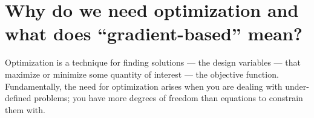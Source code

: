 \documentclass[conf]{new-aiaa}
\begin{document}






    \section{Why do we need optimization and what does ``gradient-based'' mean?}
        
        Optimization is a technique for finding solutions --- the design variables --- that maximize or minimize some quantity of interest  --- the objective function. 
        Fundamentally, the need for optimization arises when you are dealing with under-defined problems; you have more degrees of freedom than equations to constrain them with. 
\end{document}
